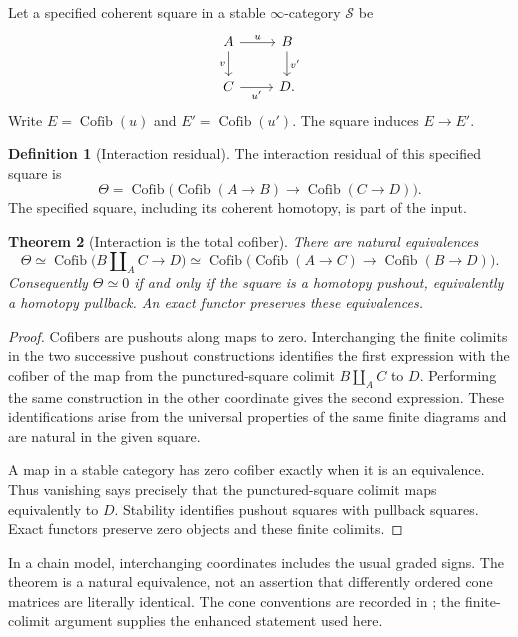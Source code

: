 \documentclass[11pt]{article}
\newtheorem{theorem}{Theorem}[section]
\theoremstyle{definition}
\newtheorem{definition}[theorem]{Definition}
\theoremstyle{remark}
\newcommand{\Cofib}{\operatorname{Cofib}}
\begin{document}
Let a specified coherent square in a stable $\infty$-category $\mathcal S$ be
\[
\begin{tikzcd}
 A \arrow[r,"u"] \arrow[d,"v"'] & B \arrow[d,"v'"]\\
 C \arrow[r,"u'"'] & D.
\end{tikzcd}
\]
Write $E=\Cofib(u)$ and $E'=\Cofib(u')$. The square induces $E\to E'$.

\begin{definition}[Interaction residual]\label{def:interaction-residual}
The interaction residual of this specified square is
\[
 \Theta=\Cofib\bigl(\Cofib(A\to B)\longrightarrow
                         \Cofib(C\to D)\bigr).
\]
The specified square, including its coherent homotopy, is part of the input.
\end{definition}

\begin{theorem}[Interaction is the total cofiber]\label{thm:interaction-cofiber}
There are natural equivalences
\[
 \Theta\simeq\Cofib\bigl(B\amalg_A C\longrightarrow D\bigr)
 \simeq\Cofib\bigl(\Cofib(A\to C)\longrightarrow
                         \Cofib(B\to D)\bigr).
\]
Consequently $\Theta\simeq0$ if and only if the square is a homotopy pushout, equivalently a homotopy pullback. An exact functor preserves these equivalences.
\end{theorem}

\begin{proof}
Cofibers are pushouts along maps to zero. Interchanging the finite colimits in the two successive pushout constructions identifies the first expression with the cofiber of the map from the punctured-square colimit $B\amalg_A C$ to $D$. Performing the same construction in the other coordinate gives the second expression. These identifications arise from the universal properties of the same finite diagrams and are natural in the given square.

A map in a stable category has zero cofiber exactly when it is an equivalence. Thus vanishing says precisely that the punctured-square colimit maps equivalently to $D$. Stability identifies pushout squares with pullback squares. Exact functors preserve zero objects and these finite colimits.
\end{proof}

In a chain model, interchanging coordinates includes the usual graded signs. The theorem is a natural equivalence, not an assertion that differently ordered cone matrices are literally identical. The cone conventions are recorded in \cite{StacksCones}; the finite-colimit argument supplies the enhanced statement used here.
\end{document}
